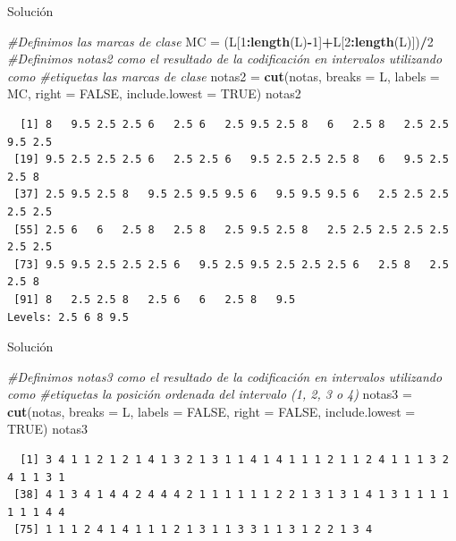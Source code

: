 \documentclass[
  ignorenonframetext,
]{beamer}
\newenvironment{Shaded}{\begin{snugshade}}{\end{snugshade}}
\newcommand{\AttributeTok}[1]{\textcolor[rgb]{0.13,0.29,0.53}{#1}}
\newcommand{\CommentTok}[1]{\textcolor[rgb]{0.56,0.35,0.01}{\textit{#1}}}
\newcommand{\ConstantTok}[1]{\textcolor[rgb]{0.56,0.35,0.01}{#1}}
\newcommand{\DecValTok}[1]{\textcolor[rgb]{0.00,0.00,0.81}{#1}}
\newcommand{\FunctionTok}[1]{\textcolor[rgb]{0.13,0.29,0.53}{\textbf{#1}}}
\newcommand{\NormalTok}[1]{#1}
\newcommand{\OtherTok}[1]{\textcolor[rgb]{0.56,0.35,0.01}{#1}}
\newcommand{\SpecialCharTok}[1]{\textcolor[rgb]{0.81,0.36,0.00}{\textbf{#1}}}
\begin{document}
\begin{frame}[fragile]{Solución}
\label{soluciuxf3n-18}
\begin{Shaded}
\begin{Highlighting}[]
\CommentTok{\#Definimos las marcas de clase}
\NormalTok{MC }\OtherTok{=}\NormalTok{ (L[}\DecValTok{1}\SpecialCharTok{:}\FunctionTok{length}\NormalTok{(L)}\SpecialCharTok{{-}}\DecValTok{1}\NormalTok{]}\SpecialCharTok{+}\NormalTok{L[}\DecValTok{2}\SpecialCharTok{:}\FunctionTok{length}\NormalTok{(L)])}\SpecialCharTok{/}\DecValTok{2}
\CommentTok{\#Definimos notas2 como el resultado de la codificación en intervalos utilizando como }
\CommentTok{\#etiquetas las marcas de clase}
\NormalTok{notas2 }\OtherTok{=} \FunctionTok{cut}\NormalTok{(notas, }\AttributeTok{breaks =}\NormalTok{ L, }\AttributeTok{labels =}\NormalTok{ MC, }\AttributeTok{right =} \ConstantTok{FALSE}\NormalTok{, }\AttributeTok{include.lowest =} \ConstantTok{TRUE}\NormalTok{)}
\NormalTok{notas2}
\end{Highlighting}
\end{Shaded}

\begin{verbatim}
  [1] 8   9.5 2.5 2.5 6   2.5 6   2.5 9.5 2.5 8   6   2.5 8   2.5 2.5 9.5 2.5
 [19] 9.5 2.5 2.5 2.5 6   2.5 2.5 6   9.5 2.5 2.5 2.5 8   6   9.5 2.5 2.5 8  
 [37] 2.5 9.5 2.5 8   9.5 2.5 9.5 9.5 6   9.5 9.5 9.5 6   2.5 2.5 2.5 2.5 2.5
 [55] 2.5 6   6   2.5 8   2.5 8   2.5 9.5 2.5 8   2.5 2.5 2.5 2.5 2.5 2.5 2.5
 [73] 9.5 9.5 2.5 2.5 2.5 6   9.5 2.5 9.5 2.5 2.5 2.5 6   2.5 8   2.5 2.5 8  
 [91] 8   2.5 2.5 8   2.5 6   6   2.5 8   9.5
Levels: 2.5 6 8 9.5
\end{verbatim}
\end{frame}

\begin{frame}[fragile]{Solución}
\label{soluciuxf3n-19}
\begin{Shaded}
\begin{Highlighting}[]
\CommentTok{\#Definimos notas3 como el resultado de la codificación en intervalos utilizando como }
\CommentTok{\#etiquetas la posición ordenada del intervalo (1, 2, 3 o 4)}
\NormalTok{notas3 }\OtherTok{=} \FunctionTok{cut}\NormalTok{(notas, }\AttributeTok{breaks =}\NormalTok{ L, }\AttributeTok{labels =} \ConstantTok{FALSE}\NormalTok{, }\AttributeTok{right =} \ConstantTok{FALSE}\NormalTok{, }\AttributeTok{include.lowest =} \ConstantTok{TRUE}\NormalTok{)}
\NormalTok{notas3}
\end{Highlighting}
\end{Shaded}

\begin{verbatim}
  [1] 3 4 1 1 2 1 2 1 4 1 3 2 1 3 1 1 4 1 4 1 1 1 2 1 1 2 4 1 1 1 3 2 4 1 1 3 1
 [38] 4 1 3 4 1 4 4 2 4 4 4 2 1 1 1 1 1 1 2 2 1 3 1 3 1 4 1 3 1 1 1 1 1 1 1 4 4
 [75] 1 1 1 2 4 1 4 1 1 1 2 1 3 1 1 3 3 1 1 3 1 2 2 1 3 4
\end{verbatim}
\end{frame}
\end{document}
